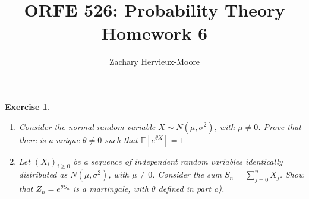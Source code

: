 \documentclass[12pt]{article}
\title{ORFE 526: Probability Theory \\ Homework 6}
\author{Zachary Hervieux-Moore}
\date{\displaydate{date}}
\theoremstyle{colon}
\newtheorem{exercise}{Exercise}
\begin{document}
\maketitle

\clearpage

\begin{exercise}
  \leavevmode

  \begin{enumerate}[label=\alph*)]
    \item Consider the normal random variable $X \sim N(\mu, \sigma^2)$, with $\mu \neq 0$. Prove that there is a unique $\theta \neq 0$ such that $\mathbb{E}[e^{\theta X}] = 1$
    \item Let $(X_i)_{i \geq 0}$ be a sequence of independent random variables identically distributed as $N(\mu, \sigma^2)$, with $\mu \neq 0$. Consider the sum $S_n = \sum_{j=0}^n X_j$. Show that $Z_n = e^{\theta S_n}$ is a martingale, with $\theta$ defined in part a).
  \end{enumerate}
\end{exercise}
\end{document}
